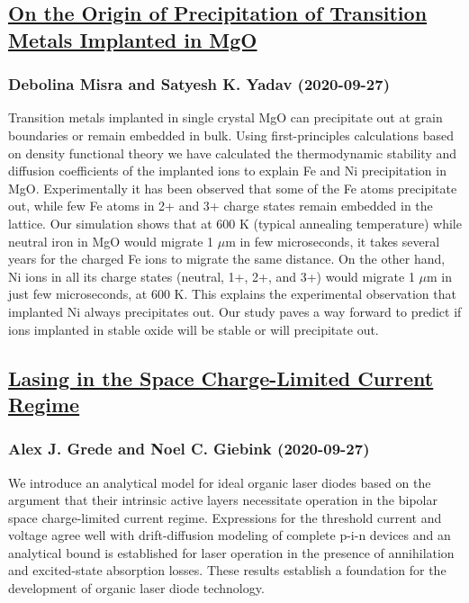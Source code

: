 \subsection*{\href{http://arxiv.org/abs/2009.12734v1}{On the Origin of Precipitation of Transition Metals Implanted in MgO}}
\subsubsection*{Debolina Misra and Satyesh K. Yadav (2020-09-27)}
Transition metals implanted in single crystal MgO can precipitate out at
grain boundaries or remain embedded in bulk. Using first-principles
calculations based on density functional theory we have calculated the
thermodynamic stability and diffusion coefficients of the implanted ions to
explain Fe and Ni precipitation in MgO. Experimentally it has been observed
that some of the Fe atoms precipitate out, while few Fe atoms in 2+ and 3+
charge states remain embedded in the lattice. Our simulation shows that at 600
K (typical annealing temperature) while neutral iron in MgO would migrate 1
$\mu$m in few microseconds, it takes several years for the charged Fe ions to
migrate the same distance. On the other hand, Ni ions in all its charge states
(neutral, 1+, 2+, and 3+) would migrate 1 $\mu$m in just few microseconds, at
600 K. This explains the experimental observation that implanted Ni always
precipitates out. Our study paves a way forward to predict if ions implanted in
stable oxide will be stable or will precipitate out.

\subsection*{\href{http://arxiv.org/abs/2009.12730v1}{Lasing in the Space Charge-Limited Current Regime}}
\subsubsection*{Alex J. Grede and Noel C. Giebink (2020-09-27)}
We introduce an analytical model for ideal organic laser diodes based on the
argument that their intrinsic active layers necessitate operation in the
bipolar space charge-limited current regime. Expressions for the threshold
current and voltage agree well with drift-diffusion modeling of complete p-i-n
devices and an analytical bound is established for laser operation in the
presence of annihilation and excited-state absorption losses. These results
establish a foundation for the development of organic laser diode technology.

